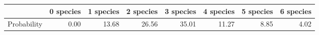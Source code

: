 \begin{table}[ht]
\centering
\begin{tabular}{rrrrrrrr}
  \hline
 & 0 species & 1 species & 2 species & 3 species & 4 species & 5 species & 6 species \\ 
  \hline
Probability & 0.00 & 13.68 & 26.56 & 35.01 & 11.27 & 8.85 & 4.02 \\ 
   \hline
\end{tabular}
\end{table}

